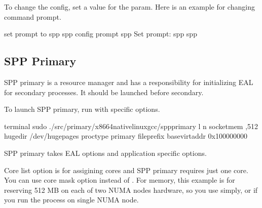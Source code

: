 \documentclass[a4paper,11pt,openany,oneside,english]{sphinxmanual}
\begin{document}
To change the config, set a value for the param.
Here is an example for changing command prompt.

\begin{sphinxVerbatim}[commandchars=\\\{\},formatcom=\footnotesize]
\PYGZsh{} set prompt to \PYGZdq{}\PYGZdl{} spp \PYGZdq{}
spp \PYGZgt{} config prompt \PYGZdq{}\PYGZdl{} spp \PYGZdq{}
Set prompt: \PYGZdq{}\PYGZdl{} spp \PYGZdq{}
\PYGZdl{} spp
\end{sphinxVerbatim}


\subsection{SPP Primary}
\label{\detokenize{gsg/howto_use:spp-primary}}\label{\detokenize{gsg/howto_use:spp-gsg-howto-pri}}
SPP primary is a resource manager and has a responsibility for
initializing EAL for secondary processes. It should be launched before
secondary.

To launch SPP primary, run  with specific options.

\begin{sphinxVerbatim}[commandchars=\\\{\},formatcom=\footnotesize]
 terminal 
 sudo ./src/primary/x86\PYGZus{}64\PYGZhy{}native\PYGZhy{}linux\PYGZhy{}gcc/spp\PYGZus{}primary 
    \PYGZhy{}l  \PYGZhy{}n  
    \PYGZhy{}\PYGZhy{}socket\PYGZhy{}mem ,512 
    \PYGZhy{}\PYGZhy{}huge\PYGZhy{}dir /dev/hugepages 
    \PYGZhy{}\PYGZhy{}proc\PYGZhy{}type primary 
    \PYGZhy{}\PYGZhy{}file\PYGZhy{}prefix  
    \PYGZhy{}\PYGZhy{}base\PYGZhy{}virtaddr 0x100000000
\end{sphinxVerbatim}

SPP primary takes EAL options and application specific options.

Core list option  is for assigining cores and SPP primary requires just
one core. You can use core mask option  instead of .
For memory, this example is for reserving 512 MB on each of two NUMA nodes
hardware, so you use  simply, or 
if you run the process on single NUMA node.
\end{document}
